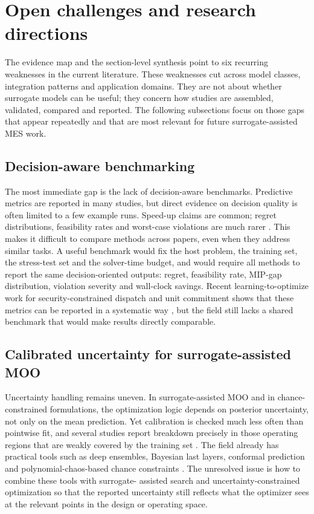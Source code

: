 \section{Open challenges and research directions}
\label{sec:challenges}
The evidence map and the section-level synthesis point to six recurring
weaknesses in the current literature. These weaknesses cut across model
classes, integration patterns and application domains. They are not
about whether surrogate models can be useful; they concern how studies
are assembled, validated, compared and reported. The following
subsections focus on those gaps that appear repeatedly and that are most
relevant for future surrogate-assisted MES work.
\subsection{Decision-aware benchmarking}
\label{sec:ch:bench}
The most immediate gap is the lack of decision-aware benchmarks.
Predictive metrics are reported in many studies, but direct evidence on
decision quality is often limited to a few example runs. Speed-up claims
are common; regret distributions, feasibility rates and worst-case
violations are much rarer
\cite{Mylonopoulos202332697,Ruan2021221,Khaloie2025,Lim2025,Perera2019191}.
This makes it difficult to compare methods across papers, even when they
address similar tasks. A useful benchmark would fix the host problem,
the training set, the stress-test set and the solver-time budget, and
would require all methods to report the same decision-oriented outputs:
regret, feasibility rate, MIP-gap distribution, violation severity and
wall-clock savings. Recent learning-to-optimize work for
security-constrained dispatch and unit commitment shows that these
metrics can be reported in a systematic way
\cite{Wu2022231,Chen20244723,Chen2022,Wu2024391,Liang20246508}, but
the field still lacks a shared benchmark that would make results
directly comparable.
\subsection{Calibrated uncertainty for surrogate-assisted MOO}
\label{sec:ch:uq}
Uncertainty handling remains uneven. In surrogate-assisted MOO and in
chance-constrained formulations, the optimization logic depends on
posterior uncertainty, not only on the mean prediction. Yet calibration
is checked much less often than pointwise fit, and several studies
report breakdown precisely in those operating regions that are weakly
covered by the training set
\cite{Hu2020,Hu2021671,Volodina2022,Lawson201647,Hu2024,Buchanan2024,Subedi2026157}.
The field already has practical tools such as deep ensembles, Bayesian
last layers, conformal prediction and polynomial-chaos-based chance
constraints
\cite{Chen2023657,Liang20246508,Muhlpfordt20194806,Koirala20242284,Xu20212696}.
The unresolved issue is how to combine these tools with surrogate-
assisted search and uncertainty-constrained optimization so that the
reported uncertainty still reflects what the optimizer sees at the
relevant points in the design or operating space.
